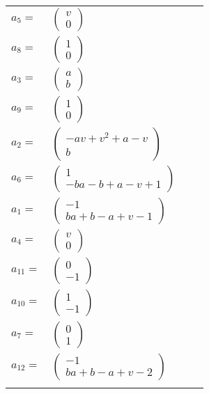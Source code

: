 \documentclass[1p]{elsarticle_modified}
\theoremstyle{definition}
\begin{document}
\begin{tabular}{m{7pt} m{180pt} m{7pt} m{180pt} }
\flushright $a_{5}=$&$\begin{pmatrix}v\\0\end{pmatrix}$ \\
\flushright $a_{8}=$&$\begin{pmatrix}1\\0\end{pmatrix}$ \\
\flushright $a_{3}=$&$\begin{pmatrix}a\\b\end{pmatrix}$ \\
\flushright $a_{9}=$&$\begin{pmatrix}1\\0\end{pmatrix}$ \\
\flushright $a_{2}=$&$\begin{pmatrix}- a v+v^2+a- v\\b\end{pmatrix}$ \\
\flushright $a_{6}=$&$\begin{pmatrix}1\\- b a- b+a- v+1\end{pmatrix}$ \\
\flushright $a_{1}=$&$\begin{pmatrix}-1\\b a+b- a+v-1\end{pmatrix}$ \\
\flushright $a_{4}=$&$\begin{pmatrix}v\\0\end{pmatrix}$ \\
\flushright $a_{11}=$&$\begin{pmatrix}0\\-1\end{pmatrix}$ \\
\flushright $a_{10}=$&$\begin{pmatrix}1\\-1\end{pmatrix}$ \\
\flushright $a_{7}=$&$\begin{pmatrix}0\\1\end{pmatrix}$ \\
\flushright $a_{12}=$&$\begin{pmatrix}-1\\b a+b- a+v-2\end{pmatrix}$\\&\end{tabular}
\end{document}
